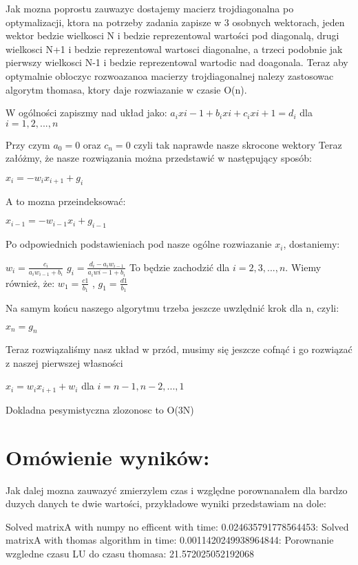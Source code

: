 \documentclass[12pt]{article}
\begin{document}
Jak mozna poprostu zauwazyc dostajemy macierz trojdiagonalna po optymalizacji, ktora na potrzeby zadania zapisze w 3 osobnych wektorach, jeden wektor bedzie wielkosci N i bedzie reprezentowal wartości pod diagonalą, drugi wielkosci N+1 i bedzie reprezentowal wartosci diagonalne, a trzeci podobnie jak pierwszy wielkosci N-1 i bedzie reprezentowal wartodic nad doagonala. Teraz aby optymalnie obloczyc rozwoazanoa macierzy trojdiagonalnej nalezy zastosowac algorytm thomasa, ktory daje rozwiazanie w czasie O(n).
\begin{center}
W ogólności zapiszmy nad układ jako:
$a_{i}x{i-1} + b_{i}x{i} + c_{i}x{i+1} = d_{i}$ dla $i = 1,2,...,n$
\end{center}
Przy czym $a_{0} = 0$ oraz $c_{n} = 0$ czyli tak naprawde nasze skrocone wektory
Teraz załóżmy, że nasze rozwiązania można przedstawić w następujący sposób:
\begin{center}
$x_{i} = -w_{i}x_{i+1} + g_{i}$
\end{center}
A to mozna przeindeksować:
\begin{center}
$x_{i-1} = -w_{i-1}x_{i} + g_{i-1}$
\end{center}
Po odpowiednich podstawieniach pod nasze ogólne rozwiazanie $x_{i}$, dostaniemy:
\begin{center}
$w_{i} = \frac{c_{i}}{a_{i}w_{i-1}+b_{i}}$\newline\newline
$g_{i} = \frac{d_{i}-a_{i}w_{i-1}}{a_{i}w{i-1}+b_{i}}$\newline\newline
To będzie zachodzić dla $i=2,3,...,n$.
Wiemy również, że:\newline\newline
$w_{1} = \frac{c{1}}{b_{1}}$ ,
$g_{1} = \frac{d{1}}{b_{1}}$
\end{center}
Na samym końcu naszego algorytmu trzeba jeszcze uwzlędnić krok dla n, czyli:
\begin{center}
$x_{n} = g_{n}$
\end{center}
Teraz rozwiązaliśmy nasz układ w przód, musimy się jeszcze cofnąć i go rozwiązać z naszej pierwszej własności 
\begin{center}
$x_{i} = w_{i}x_{i+1}+w_{i}$ dla $i = n-1, n-2,...,1$
\end{center}


Dokladna pesymistyczna zlozonosc to O(3N)
\section{Omówienie wyników:}
Jak dalej mozna zauwazyć zmierzylem czas i względne porownanałem dla bardzo duzych danych te dwie wartości, przykładowe wyniki przedstawiam na dole:
\begin{center}
    Solved matrixA with numpy no efficent with time: 0.024635791778564453:
    \newline\newline
    Solved matrixA with thomas algorithm in time: 0.0011420249938964844:
    \newline\newline
    Porownanie wzgledne czasu LU do czasu thomasa: 21.572025052192068
\end{center}
\end{document}
